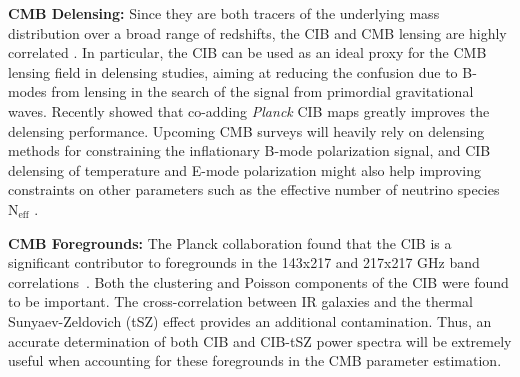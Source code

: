 {\bf CMB Delensing:} Since they are both tracers of the underlying mass distribution over
a broad range of redshifts, the CIB and CMB lensing are highly correlated
\citep{planckXVIII}. In particular, the CIB can be used as
an ideal proxy for the CMB lensing field in delensing studies, aiming at
reducing the confusion due to B-modes from lensing in the search of the
signal from primordial gravitational waves.
Recently \cite{sherwin2015,larsen2016} showed that co-adding {\it Planck} CIB maps
greatly improves the delensing performance. Upcoming CMB surveys
will heavily rely on delensing methods for constraining the
inflationary B-mode polarization signal, and CIB delensing of temperature and E-mode
polarization might also help improving constraints on other parameters such as the effective
number of neutrino species $\mathrm{N_{eff}}$ \citep{larsen2016}.

{\bf CMB Foregrounds:} The Planck collaboration found that the CIB is 
a significant contributor to foregrounds in the 143x217 and 217x217 GHz 
band correlations~\citep{planck2016like}. Both the clustering and Poisson components of the 
CIB were found to be important. The cross-correlation between IR galaxies and the thermal
Sunyaev-Zeldovich (tSZ) effect provides an additional contamination. 
Thus, an accurate determination of both CIB and CIB-tSZ power
spectra will be extremely useful when accounting for these foregrounds
in the CMB parameter estimation.

